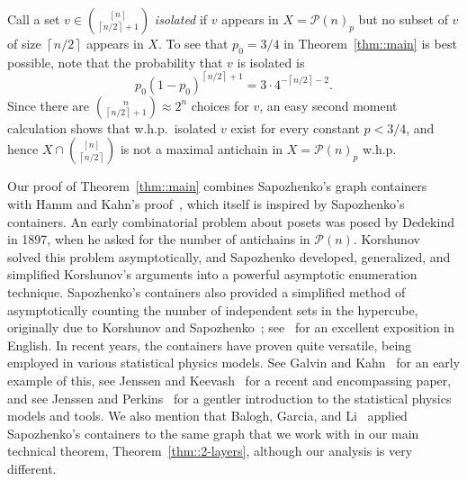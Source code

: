 \documentclass[12pt]{article}
\renewcommand{\P}{\mathcal{P}}
\newcommand{\ceil}[1]{\left\lceil#1\right\rceil}
\begin{document}
Call a set $v \in \binom{[n]}{\ceil{n/2}+1}$ \emph{isolated} if $v$ appears in $X=\P(n)_p$ but no subset of $v$ of size $\ceil{n/2}$ appears in $X$. To see that $p_0 = 3/4$ in Theorem~\ref{thm::main} is best possible, note that the probability that $v$ is isolated is
\[ p_0 (1-p_0)^{\ceil{n/2}+1} = 3 \cdot 4^{-\ceil{n/2}-2} .\]
Since there are $\binom{n}{\ceil{n/2}+1} \approx 2^n$ choices for $v$, an easy second moment calculation shows that w.h.p.\ isolated $v$ exist for every constant $p<3/4$, and hence $X \cap \binom{[n]}{\ceil{n/2}}$ is not a maximal antichain in $X = \P(n)_p$ w.h.p.

Our proof of Theorem~\ref{thm::main} combines Sapozhenko's graph containers~\cite{Sap} with Hamm and Kahn's proof~\cite{HK2}, which itself is inspired by Sapozhenko's containers. An early combinatorial problem about posets was posed by Dedekind~\cite{Dede} in 1897, when he asked for the number of antichains in $\P(n)$. Korshunov~\cite{Korsh} solved this problem asymptotically, and Sapozhenko developed, generalized, and simplified Korshunov's arguments into a powerful asymptotic enumeration technique. Sapozhenko's containers also provided a simplified method of asymptotically counting the number of independent sets in the hypercube, originally due to Korshunov and Sapozhenko~\cite{KS}; see~\cite{Galvin} for an excellent exposition in English. In recent years, the containers have proven quite versatile, being employed in various statistical physics models. See Galvin and Kahn~\cite{GK} for an early example of this, see Jenssen and Keevash~\cite{JK} for a recent and encompassing paper, and see Jenssen and Perkins~\cite{JP} for a gentler introduction to the statistical physics models and tools. We also mention that Balogh, Garcia, and Li~\cite{BGL} applied Sapozhenko's containers to the same graph that we work with in our main technical theorem, Theorem~\ref{thm::2-layers}, although our analysis is very different.
\end{document}

